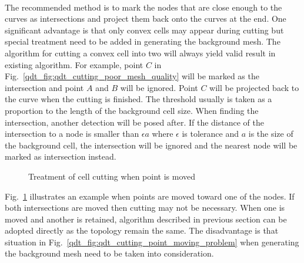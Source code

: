 \paragraph{}
The recommended method is to mark the nodes that are close enough to the curves as intersections and project them back onto the curves at the end.
One significant advantage is that only convex cells may appear during cutting but special treatment need to be added in generating the background mesh.
The algorithm for cutting a convex cell into two will always yield valid result in existing algorithm.
For example, point $C$ in Fig.~\ref{qdt_fig:qdt_cutting_poor_mesh_quality} will be marked as the intersection and point $A$ and $B$ will be ignored.
Point $C$ will be projected back to the curve when the cutting is finished.
The threshold usually is taken as a proportion to the length of the background cell size.
When finding the intersection, another detection will be posed after.
If the distance of the intersection to a node is smaller than $\epsilon a$ where $\epsilon$ is tolerance and $a$ is the size of the background cell, the intersection will be ignored and the nearest node will be marked as intersection instead.
\begin{figure}
    \centering
    \caption[Treatment of cell cutting when point is moved]{Treatment of cell cutting when point is moved}
    \label{qdt_fig:qdt_cutting_point_moving_1}
\end{figure}
Fig.~\ref{qdt_fig:qdt_cutting_point_moving_1} illustrates an example when points are moved toward one of the nodes.
If both intersections are moved then cutting may not be necessary.
When one is moved and another is retained, algorithm described in previous section can be adopted directly as the topology remain the same.
The disadvantage is that situation in Fig.~\ref{qdt_fig:qdt_cutting_point_moving_problem} when generating the background mesh need to be taken into consideration.
